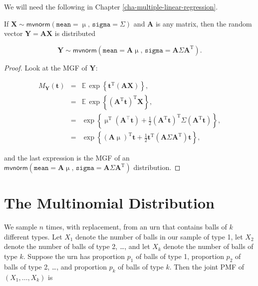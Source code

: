 \documentclass[]{book}
\numberwithin{equation}{chapter}
\numberwithin{figure}{chapter}
\theoremstyle{plain}
\theoremstyle{definition}
\theoremstyle{remark}
\theoremstyle{definition}
\theoremstyle{definition}
\theoremstyle{remark}
\let\BeginKnitrBlock\begin \let\EndKnitrBlock\end
\begin{document}
We will need the following in Chapter
\ref{cha-multiple-linear-regression}.

\bigskip

\BeginKnitrBlock{theorem}
\protect\hypertarget{thm:mvnorm-dist-matrix-prod}{}{\label{thm:mvnorm-dist-matrix-prod}}If
\(\mathbf{X} \sim \mathsf{mvnorm}(\mathtt{mean} = \upmu, \, \mathtt{sigma} = \Sigma)\)
and \(\mathbf{A}\) is any matrix, then the random vector
\(\mathbf{Y}=\mathbf{AX}\) is distributed

\begin{equation}
\mathbf{Y}\sim\mathsf{mvnorm}(\mathtt{mean}=\mathbf{A}\upmu,\,\mathtt{sigma}=\mathbf{A}\Sigma\mathbf{A}^{\mathrm{T}}).
\end{equation}
\EndKnitrBlock{theorem}

\bigskip

\BeginKnitrBlock{proof}
\iffalse {Proof. } \fi Look at the MGF of \(\mathbf{Y}\):

\begin{eqnarray*}
M_{\mathbf{Y}}(\mathbf{t}) & = & \mathbb{E}\,\exp\left\{ \mathbf{t}^{\mathrm{T}}(\mathbf{AX})\right\} ,\\
 & = & \mathbb{E}\,\exp\left\{ (\mathbf{A}^{\mathrm{T}}\mathbf{t})^{\mathrm{T}}\mathbf{X}\right\} ,\\
 & = & \exp\left\{ \upmu^{\mathrm{T}}(\mathbf{A}^{\top}\mathbf{t})+\frac{1}{2}(\mathbf{A}^{\mathrm{T}}\mathbf{t})^{\mathrm{T}}\Sigma(\mathbf{A}^{\mathrm{T}}\mathbf{t})\right\} ,\\
 & = & \exp\left\{ \left(\mathbf{A}\upmu\right)^{\mathrm{T}}\mathbf{t}+\frac{1}{2}\mathbf{t}^{\mathrm{T}}\left(\mathbf{A}\Sigma\mathbf{A}^{\mathrm{T}}\right)\mathbf{t}\right\},
\end{eqnarray*}

and the last expression is the MGF of an
\(\mathsf{mvnorm}(\mathtt{mean}=\mathbf{A}\upmu,\,\mathtt{sigma}=\mathbf{A}\Sigma\mathbf{A}^{\mathrm{T}})\)
distribution.
\EndKnitrBlock{proof}

\section{The Multinomial Distribution}\label{sec-multinomial}

We sample \(n\) times, with replacement, from an urn that contains balls
of \(k\) different types. Let \(X_{1}\) denote the number of balls in
our sample of type 1, let \(X_{2}\) denote the number of balls of type
2, \ldots{}, and let \(X_{k}\) denote the number of balls of type \(k\).
Suppose the urn has proportion \(p_{1}\) of balls of type 1, proportion
\(p_{2}\) of balls of type 2, \ldots{}, and proportion \(p_{k}\) of
balls of type \(k\). Then the joint PMF of \((X_{1},\ldots,X_{k})\) is
\end{document}
